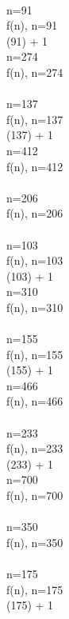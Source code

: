 \documentclass{article}
\begin{document}
 \Rightarrow {} 
 \\ 
 \Rightarrow n=91
 \\[3mm] 
f(n), n=91
 \\ 
 (91) + 1
 \\ 
 \Rightarrow n=274
 \\[3mm] 
f(n), n=274
 \\ 
 \Rightarrow {} 
 \\ 
 \Rightarrow n=137
 \\[3mm] 
f(n), n=137
 \\ 
 (137) + 1
 \\ 
 \Rightarrow n=412
 \\[3mm] 
f(n), n=412
 \\ 
 \Rightarrow {} 
 \\ 
 \Rightarrow n=206
 \\[3mm] 
f(n), n=206
 \\ 
 \Rightarrow {} 
 \\ 
 \Rightarrow n=103
 \\[3mm] 
f(n), n=103
 \\ 
 (103) + 1
 \\ 
 \Rightarrow n=310
 \\[3mm] 
f(n), n=310
 \\ 
 \Rightarrow {} 
 \\ 
 \Rightarrow n=155
 \\[3mm] 
f(n), n=155
 \\ 
 (155) + 1
 \\ 
 \Rightarrow n=466
 \\[3mm] 
f(n), n=466
 \\ 
 \Rightarrow {} 
 \\ 
 \Rightarrow n=233
 \\[3mm] 
f(n), n=233
 \\ 
 (233) + 1
 \\ 
 \Rightarrow n=700
 \\[3mm] 
f(n), n=700
 \\ 
 \Rightarrow {} 
 \\ 
 \Rightarrow n=350
 \\[3mm] 
f(n), n=350
 \\ 
 \Rightarrow {} 
 \\ 
 \Rightarrow n=175
 \\[3mm] 
f(n), n=175
 \\ 
 (175) + 1
 \\ 
\end{document}
